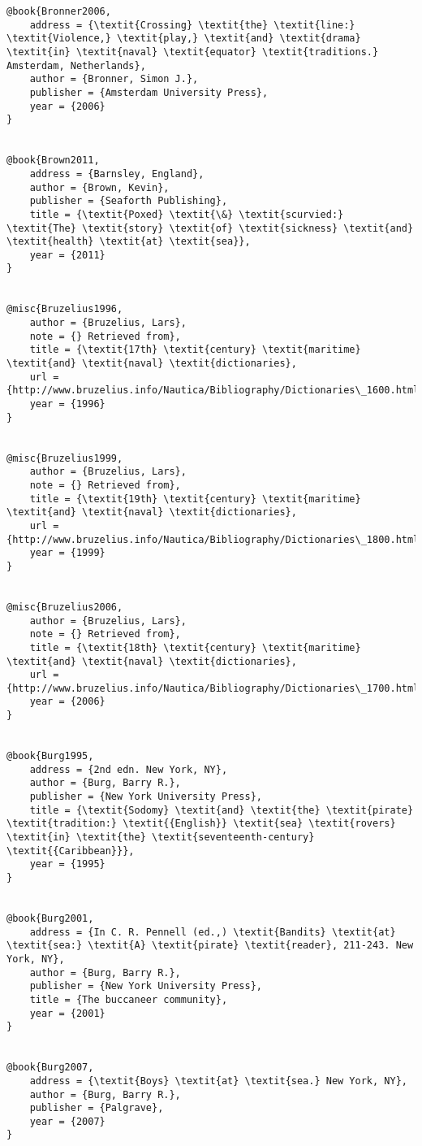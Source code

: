 \begin{verbatim}
@book{Bronner2006,
	address = {\textit{Crossing} \textit{the} \textit{line:} \textit{Violence,} \textit{play,} \textit{and} \textit{drama} \textit{in} \textit{naval} \textit{equator} \textit{traditions.} Amsterdam, Netherlands},
	author = {Bronner, Simon J.},
	publisher = {Amsterdam University Press},
	year = {2006}
}


@book{Brown2011,
	address = {Barnsley, England},
	author = {Brown, Kevin},
	publisher = {Seaforth Publishing},
	title = {\textit{Poxed} \textit{\&} \textit{scurvied:} \textit{The} \textit{story} \textit{of} \textit{sickness} \textit{and} \textit{health} \textit{at} \textit{sea}},
	year = {2011}
}


@misc{Bruzelius1996,
	author = {Bruzelius, Lars},
	note = {} Retrieved from},
	title = {\textit{17th} \textit{century} \textit{maritime} \textit{and} \textit{naval} \textit{dictionaries},
	url = {http://www.bruzelius.info/Nautica/Bibliography/Dictionaries\_1600.html},
	year = {1996}
}


@misc{Bruzelius1999,
	author = {Bruzelius, Lars},
	note = {} Retrieved from},
	title = {\textit{19th} \textit{century} \textit{maritime} \textit{and} \textit{naval} \textit{dictionaries},
	url = {http://www.bruzelius.info/Nautica/Bibliography/Dictionaries\_1800.html},
	year = {1999}
}


@misc{Bruzelius2006,
	author = {Bruzelius, Lars},
	note = {} Retrieved from},
	title = {\textit{18th} \textit{century} \textit{maritime} \textit{and} \textit{naval} \textit{dictionaries},
	url = {http://www.bruzelius.info/Nautica/Bibliography/Dictionaries\_1700.html},
	year = {2006}
}


@book{Burg1995,
	address = {2nd edn. New York, NY},
	author = {Burg, Barry R.},
	publisher = {New York University Press},
	title = {\textit{Sodomy} \textit{and} \textit{the} \textit{pirate} \textit{tradition:} \textit{{English}} \textit{sea} \textit{rovers} \textit{in} \textit{the} \textit{seventeenth-century} \textit{{Caribbean}}},
	year = {1995}
}


@book{Burg2001,
	address = {In C. R. Pennell (ed.,) \textit{Bandits} \textit{at} \textit{sea:} \textit{A} \textit{pirate} \textit{reader}, 211-243. New York, NY},
	author = {Burg, Barry R.},
	publisher = {New York University Press},
	title = {The buccaneer community},
	year = {2001}
}


@book{Burg2007,
	address = {\textit{Boys} \textit{at} \textit{sea.} New York, NY},
	author = {Burg, Barry R.},
	publisher = {Palgrave},
	year = {2007}
}



\end{verbatim}
